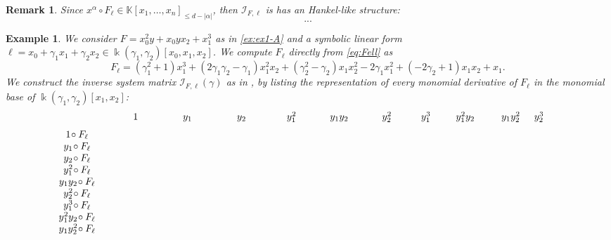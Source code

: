 \documentclass{amsart}
\theoremstyle{plain}
\newtheorem{example}[example]{Example}
\newtheorem{remark}[remark]{Remark}
\renewcommand{\k}{\Bbbk}
\newcommand{\K}{\mathbb{K}}
\def\a{\alpha}
\def\\k{{\mathsf{k}}}
\numberwithin{equation}{section}
\begin{document}
\begin{remark}
    Since $x^{\alpha} \circ F_{\ell} \in \K[x_1, \dots, x_n]_{\leq d-|\a|}$, then $\mathcal{I}_{F,\ell}$ is has an Hankel-like structure:
    \[  ... \]
\end{remark}

\begin{example} \label{ex:ex1-B}
    We consider $F=x_0^2y + x_0yx_2 + x_1^3$ as in \cref{ex:ex1-A} and a symbolic linear form $\ell = x_0 + \gamma_1 x_1 + \gamma_2 x_2 \in \k(\gamma_1,\gamma_2)[x_0,x_1,x_2]$.
    We compute $F_{\ell}$ directly from \cref{eq:Fell} as
    \[ F_{\ell} = (\gamma_1^2 + 1) x_1^3 + (2\gamma_1\gamma_2 - \gamma_1) x_1^2x_2 + (\gamma_2^2 - \gamma_2) x_1x_2^2 - 2\gamma_1 x_1^2 + (-2\gamma_2 + 
    1)x_1x_2 + x_1. \]
    We construct the inverse system matrix $\mathcal{I}_{F,\ell}(\gamma)$ as in , by listing the representation of every monomial derivative of $F_{\ell}$ in the monomial base of $\k(\gamma_1,\gamma_2)[x_1,x_2]$:
\[
\hspace{-0.3cm}\begin{array}{c@{\;}c}
&
\begin{array}{cccccccccc}
\hspace{0.9cm}1 \hspace{1.25cm} & y_1\hspace{1.25cm} & y_2\hspace{1.1cm} & y_1^2\hspace{0.85cm} & y_1y_2\hspace{0.85cm} & y_2^2\hspace{0.7cm} & y_1^3\hspace{0.55cm} & y_1^2y_2\hspace{0.4cm} & \hspace{0.2cm}y_1y_2^2 & \hspace{0.15cm} y_2^3 \hspace{0.15cm}
\end{array}
\\[6pt]
\begin{array}{c}
1\!\circ F_\ell\\
y_1\!\circ F_\ell\\
y_2\!\circ F_\ell\\
y_1^2\!\circ F_\ell\\
y_1y_2\!\circ F_\ell\\
y_2^2\!\circ F_\ell\\
y_1^3\!\circ F_\ell\\
y_1^2y_2\!\circ F_\ell\\
y_1y_2^2\!\circ F_\ell\\

\end{array}
\end{array}\]
\end{example}
\end{document}
